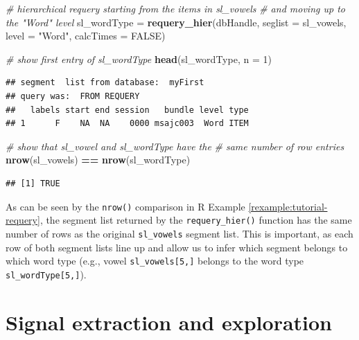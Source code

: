 \documentclass[]{book}
\newenvironment{Shaded}{\begin{snugshade}}{\end{snugshade}}
\newcommand{\CommentTok}[1]{\textcolor[rgb]{0.56,0.35,0.01}{\textit{#1}}}
\newcommand{\DataTypeTok}[1]{\textcolor[rgb]{0.13,0.29,0.53}{#1}}
\newcommand{\DecValTok}[1]{\textcolor[rgb]{0.00,0.00,0.81}{#1}}
\newcommand{\KeywordTok}[1]{\textcolor[rgb]{0.13,0.29,0.53}{\textbf{#1}}}
\newcommand{\NormalTok}[1]{#1}
\newcommand{\OperatorTok}[1]{\textcolor[rgb]{0.81,0.36,0.00}{\textbf{#1}}}
\newcommand{\OtherTok}[1]{\textcolor[rgb]{0.56,0.35,0.01}{#1}}
\newcommand{\StringTok}[1]{\textcolor[rgb]{0.31,0.60,0.02}{#1}}
\theoremstyle{definition}
\theoremstyle{definition}
\theoremstyle{definition}
\theoremstyle{remark}
\begin{document}
\begin{Shaded}
\begin{Highlighting}[]
\CommentTok{# hierarchical requery starting from the items in sl_vowels}
\CommentTok{# and moving up to the "Word" level}
\NormalTok{sl_wordType =}\StringTok{ }\KeywordTok{requery_hier}\NormalTok{(dbHandle,}
                           \DataTypeTok{seglist =}\NormalTok{ sl_vowels,}
                           \DataTypeTok{level =} \StringTok{"Word"}\NormalTok{,}
                           \DataTypeTok{calcTimes =} \OtherTok{FALSE}\NormalTok{)}

\CommentTok{# show first entry of sl_wordType}
\KeywordTok{head}\NormalTok{(sl_wordType, }\DataTypeTok{n =} \DecValTok{1}\NormalTok{)}
\end{Highlighting}
\end{Shaded}

\begin{verbatim}
## segment  list from database:  myFirst 
## query was:  FROM REQUERY 
##   labels start end session   bundle level type
## 1      F    NA  NA    0000 msajc003  Word ITEM
\end{verbatim}

\begin{Shaded}
\begin{Highlighting}[]
\CommentTok{# show that sl_vowel and sl_wordType have the}
\CommentTok{# same number of row entries}
\KeywordTok{nrow}\NormalTok{(sl_vowels) }\OperatorTok{==}\StringTok{ }\KeywordTok{nrow}\NormalTok{(sl_wordType)}
\end{Highlighting}
\end{Shaded}

\begin{verbatim}
## [1] TRUE
\end{verbatim}

As can be seen by the \texttt{nrow()} comparison in R Example
\ref{rexample:tutorial-requery}, the segment list returned by the
\texttt{requery\_hier()} function has the same number of rows as the
original \texttt{sl\_vowels} segment list. This is important, as each
row of both segment lists line up and allow us to infer which segment
belongs to which word type (e.g., vowel \texttt{sl\_vowels{[}5,{]}}
belongs to the word type \texttt{sl\_wordType{[}5,{]}}).

\hypertarget{section:tutorial-sigExtrAndExpl}{%
\section{Signal extraction and
exploration}\label{section:tutorial-sigExtrAndExpl}}
\end{document}
